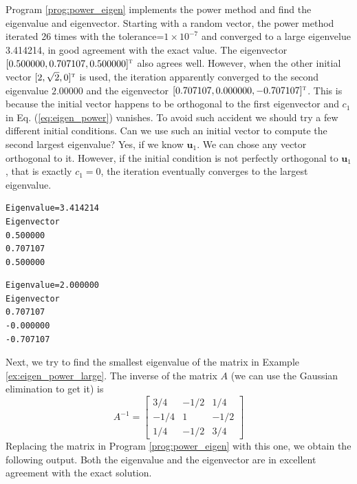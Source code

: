{\begin{example}
Program \ref{prog:power_eigen} implements the power method and find the eigenvalue and eigenvector.
Starting with a random vector, the power method iterated 26 times with the tolerance=$1\times 10^{-7}$ and converged to a large eigenvelue 3.414214, in good agreement with the exact value.  The eigenvector $[0.500000, 0.707107, 0.500000]^\textsc{t}$ also agrees well.  However, when the other initial vector $[2, \sqrt{2}, 0]^\textsc{t}$ is used, the iteration apparently converged to the second eigenvalue $2.00000$ and the eigenvector
$[0.707107,0.000000,-0.707107]^\textsc{t}$. This is because the initial vector happens to be orthogonal to the first eigenvector and
$c_1$ in Eq. (\ref{eq:eigen_power}) vanishes.  To avoid such accident we should try a few different initial conditions.  Can we use such an initial vector to compute the second largest eigenvalue?  Yes, if we know $\mathbf{u}_1$.  We can chose any vector orthogonal to it.  However, if the initial condition is not perfectly orthogonal to $\mathbf{u}_1$, that is exactly $c_1=0$,  the iteration eventually converges to the largest eigenvalue. 

\begin{center}
\begin{minipage}{3in}
\small
\begin{Verbatim}[frame=single]
% With a random initial vector
Eigenvalue=3.414214 
Eigenvector
0.500000
0.707107
0.500000
\end{Verbatim}
\normalsize
\end{minipage}
\hspace{0.1in}
\begin{minipage}{3in}
\small
\begin{Verbatim}[frame=single]
% With the other initial vector
Eigenvalue=2.000000 
Eigenvector
0.707107
-0.000000
-0.707107
\end{Verbatim}
\normalsize
\end{minipage}
\end{center}

\end{example}

\bigskip

\begin{example}\label{ex:eigen_power_small}

Next, we try to find the smallest eigenvalue of the matrix in Example \ref{ex:eigen_power_large}.
The inverse of the matrix $A$ (we can use the Gaussian elimination to get it) is
\begin{equation}
A^{-1} = \begin{bmatrix}
3/4 & - 1/2 & 1/4 \\ -1/4 & 1 & -1/2 \\ 1/4 & -1/2 & 3/4
\end{bmatrix}
\end{equation}
Replacing the matrix in Program \ref{prog:power_eigen} with this one, we obtain the following output. Both the eigenvalue and the eigenvector are in excellent agreement with the exact solution.


\end{example}}
